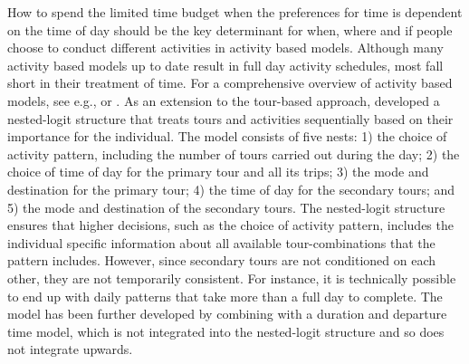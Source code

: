 How to spend the limited time budget when the preferences for time is dependent on the time of day should be the key determinant for when, where and if people choose to conduct different activities in activity based models. Although many activity based models up to date result in full day activity schedules, most fall short in their treatment of time. For a comprehensive overview of activity based models, see e.g., \citet{Pinjari11} or \citet{Rasouli14}. As an extension to the tour-based approach, \citet{Bowman01} developed a nested-logit structure that treats tours and activities sequentially based on their importance for the individual. The model consists of five nests: 1) the choice of activity pattern, including the number of tours carried out during the day; 2) the choice of time of day for the primary tour and all its trips; 3) the mode and destination for the primary tour; 4) the time of day for the secondary tours; and 5) the mode and destination of the secondary tours. The nested-logit structure ensures that higher decisions, such as the choice of activity pattern, includes the individual specific information about all available tour-combinations that the pattern includes. However, since secondary tours are not conditioned on each other, they are not temporarily consistent. For instance, it is technically possible to end up with daily patterns that take more than a full day to complete. The model has been further developed by combining with a duration and departure time model, which is not integrated into the nested-logit structure \citep{Vovsha04,Bradley10} and so does not integrate upwards. 
